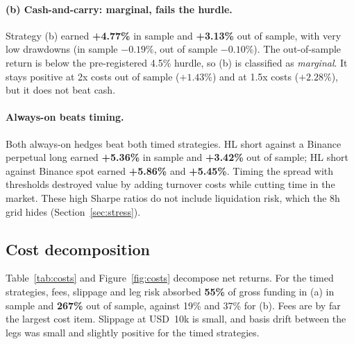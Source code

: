 \documentclass[11pt,a4paper]{article}
\begin{document}
\paragraph{(b) Cash-and-carry: marginal, fails the hurdle.}
Strategy (b) earned \textbf{+4.77\%} in sample and \textbf{+3.13\%} out of sample, with very low drawdowns (in sample $-0.19\%$, out of sample $-0.10\%$).
The out-of-sample return is below the pre-registered 4.5\% hurdle, so (b) is classified as \emph{marginal}. It stays positive at 2x costs out of sample ($+1.43\%$) and at 1.5x costs ($+2.28\%$), but it does not beat cash.

\paragraph{Always-on beats timing.}
Both always-on hedges beat both timed strategies. HL short against a Binance perpetual long earned \textbf{+5.36\%} in sample and \textbf{+3.42\%} out of sample; HL short against Binance spot earned \textbf{+5.86\%} and \textbf{+5.45\%}.
Timing the spread with thresholds destroyed value by adding turnover costs while cutting time in the market.
These high Sharpe ratios do not include liquidation risk, which the 8h grid hides (Section~\ref{sec:stress}).

\subsection{Cost decomposition}
Table~\ref{tab:costs} and Figure~\ref{fig:costs} decompose net returns.
For the timed strategies, fees, slippage and leg risk absorbed \textbf{55\%} of gross funding in (a) in sample and \textbf{267\%} out of sample, against 19\% and 37\% for (b).
Fees are by far the largest cost item. Slippage at USD~10k is small, and basis drift between the legs was small and slightly positive for the timed strategies.
\end{document}
